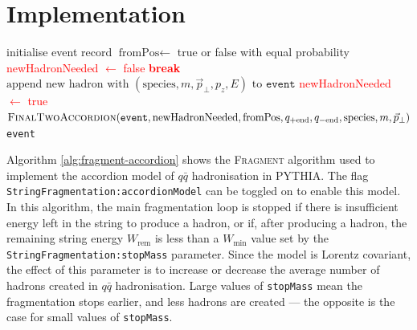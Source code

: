 \documentclass[12pt,a4paper]{report}
\begin{document}
\section{Implementation}
\begin{algorithm}
  \caption{The algorithm for $q\bar{q}$ hadronisation used to implement the accordion model.}
  \label{alg:fragment-accordion}
  \begin{algorithmic}
      \State initialise event record
      \Repeat
        \Loop
          \State $\text{fromPos} \gets$ true or false with equal probability 
          \Repeat
            \State \textcolor{red}{newHadronNeeded $\gets$ false}
            \State \textcolor{red}{\textbf{break}}
          \EndIf
          \State $\text{append new hadron with } (\text{species}, m, \vec{p}_\perp, p_z, E) \text{ to } \texttt{event}$
           
            \State \textcolor{red}{newHadronNeeded $\gets$ true}
          \EndIf
        \EndLoop
        \State \textcolor{red}{$\textsc{FinalTwoAccordion}(\texttt{event}, \text{newHadronNeeded}, \text{fromPos}, q_{+\text{end}}, q_{-\text{end}}, \\ \text{species}, m, \vec{p}_\perp)$}
      \State \Return \texttt{event}
    \EndProcedure
  \end{algorithmic}
\end{algorithm}

Algorithm \ref{alg:fragment-accordion} shows the \textsc{Fragment} algorithm used to implement the accordion model of $q\bar{q}$ hadronisation in PYTHIA. The flag \texttt{StringFragmentation:accordionModel} can be toggled on to enable this model. In this algorithm, the main fragmentation loop is stopped if there is insufficient energy left in the string to produce a hadron, or if, after producing a hadron, the remaining string energy $W_\text{rem}$ is less than a $W_\text{min}$ value set by the \texttt{StringFragmentation:stopMass} parameter. Since the model is Lorentz covariant, the effect of this parameter is to increase or decrease the average number of hadrons created in $q\bar{q}$ hadronisation. Large values of \texttt{stopMass} mean the fragmentation stops earlier, and less hadrons are created --- the opposite is the case for small values of \texttt{stopMass}.
\end{document}
